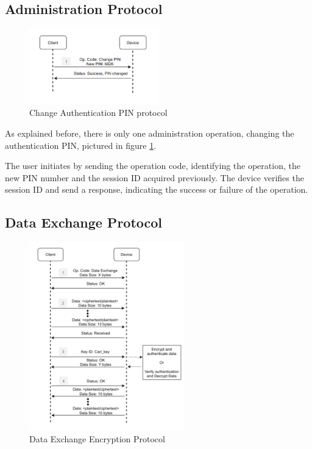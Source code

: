 \subsection{Administration Protocol} \label{chap:solution:protocol:admin}
\begin{figure}[h]
	\centering
	\includegraphics[width=0.5\textwidth]{./Images/change-PIN.png}
	\caption{Change Authentication PIN protocol}
	\label{fig:protocol:change-PIN}
\end{figure}

As explained before, there is only one administration operation, changing the authentication PIN, pictured in figure \ref{fig:protocol:change-PIN}.

The user initiates by sending the operation code, identifying the operation, the new PIN number and the session ID acquired previously. The device verifies the session ID and send a response, indicating the success or failure of the operation.

\subsection{Data Exchange Protocol} \label{chap:solution:protocol:data}

\begin{figure}[h]
	\centering
	\includegraphics[width=0.6\textwidth]{./Images/data-exchange.png}
	\caption{Data Exchange Encryption Protocol}
	\label{fig:protocol:data-exchange}
\end{figure}

